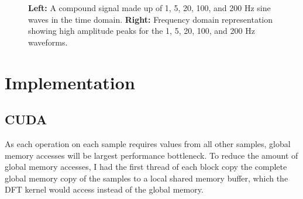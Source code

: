 \documentclass[11pt,a4paper]{article}
\begin{document}
\begin{figure}[H]%
    \centering
    \qquad
    \vspace{5pt}
    \caption{\textbf{Left:} A compound signal made up of 1, 5, 20, 100, and 200 Hz sine waves in the time domain. \textbf{Right:} Frequency domain representation showing high amplitude peaks for the 1, 5, 20, 100, and 200 Hz waveforms.}%
    \label{fig:gridwatch}%
\end{figure}

\section{Implementation}

\subsection{CUDA}



As each operation on each sample requires values from all other samples, global memory accesses will be largest performance bottleneck. To reduce the amount of global memory accesses, I had the first thread of each block copy the complete global memory copy of the samples to a local shared memory buffer, which the DFT kernel would access instead of the global memory. 
 
\end{document}
